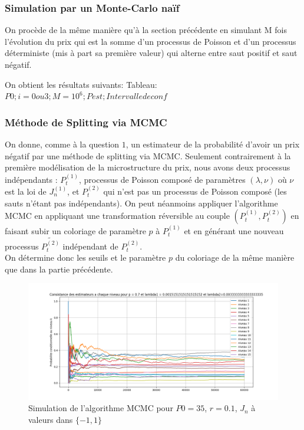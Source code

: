 \documentclass[a4paper,11pt]{article}
\begin{document}
\subsubsection{Simulation par un Monte-Carlo naïf}
On procède de la même manière qu'à la section précédente en simulant M fois l'évolution du prix qui est la somme d'un processus de Poisson et d'un processus déterministe (mis à part sa première valeur) qui alterne entre saut positif et saut négatif. 

On obtient les résultats suivants:
Tableau: $P0; i=0 ou 3 ;M=10^6; Pest; Intervalle de conf$

\subsubsection{Méthode de Splitting via MCMC}
On donne, comme à la question $1$, un estimateur de la probabilité d'avoir un prix négatif par une méthode de splitting via MCMC. Seulement contrairement à la première modélisation de la microstructure du prix, nous avons deux processus indépendants : $P_t^{(1)}$, processus de Poisson composé de paramètres $(\lambda,\nu)$ où $\nu$ est la loi de $J_n^{(1)}$, et $P_t^{(2)}$ qui n'est pas un processus de Poisson composé (les sauts n'étant pas indépendants). On peut néanmoins appliquer l'algorithme MCMC en appliquant une transformation réversible au couple $(P_t^{(1)},P_t^{(2)})$ en faisant subir un coloriage de paramètre $p$ à $P_t^{(1)}$ et en générant une nouveau processus $\widetilde{P_t^{(2)}}$ indépendant de $P_t^{(2)}$.\\

On détermine donc les seuils et le paramètre $p$ du coloriage de la même manière que dans la partie précédente.\\

\begin{figure}
\begin{center}
\caption{Simulation de l'algorithme MCMC pour $P0=35$, $r=0.1$, $J_n$ à valeurs dans $\{-1,1\}$}
\includegraphics[scale=0.5]{"Q2 MCMC"}
\end{center}
\end{figure}
\end{document}
